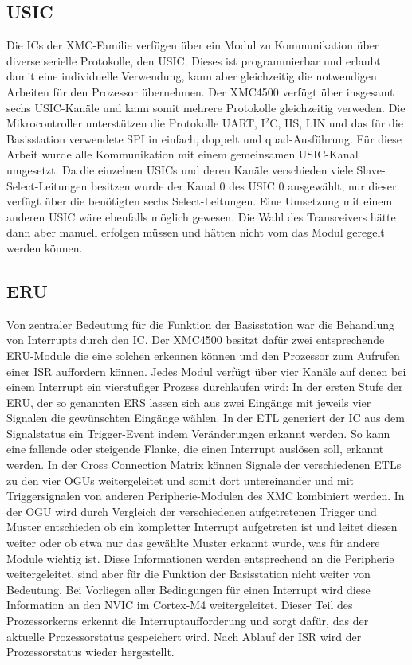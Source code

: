 \subsection{USIC}
Die \acp{IC} der XMC-Familie verfügen über ein Modul zu Kommunikation über diverse serielle Protokolle, den \acf{USIC}. Dieses ist programmierbar und erlaubt damit eine individuelle Verwendung, kann aber gleichzeitig die notwendigen Arbeiten für den Prozessor übernehmen. Der XMC4500 verfügt über insgesamt sechs \ac{USIC}-Kanäle und kann somit mehrere Protokolle gleichzeitig verweden. Die Mikrocontroller unterstützen die  Protokolle UART, I$^{2}$C, IIS, LIN und das für die Basisstation verwendete SPI in einfach, doppelt und quad-Ausführung. Für diese Arbeit wurde alle Kommunikation mit einem gemeinsamen \acs{USIC}-Kanal umgesetzt. Da die einzelnen \acp{USIC} und deren Kanäle verschieden viele Slave-Select-Leitungen besitzen wurde der Kanal $0$ des \ac{USIC} $0$ ausgewählt, nur dieser verfügt über die benötigten sechs Select-Leitungen. Eine Umsetzung mit einem anderen USIC wäre ebenfalls möglich gewesen. Die Wahl des Transceivers hätte dann aber manuell erfolgen müssen und hätten nicht vom das Modul geregelt werden können.
\subsection{ERU}
Von zentraler Bedeutung für die Funktion der Basisstation war die Behandlung von Interrupts durch den  \ac{IC}. Der XMC4500 besitzt dafür zwei entsprechende \ac{ERU}-Module die eine solchen erkennen können und den Prozessor zum Aufrufen einer \ac{ISR} auffordern können. Jedes Modul verfügt über vier Kanäle auf denen  bei einem Interrupt ein vierstufiger Prozess durchlaufen wird: In der ersten Stufe der \ac{ERU}, der so genannten \ac{ERS} lassen sich aus zwei Eingänge mit jeweils vier Signalen die gewünschten Eingänge wählen. In der \ac{ETL} generiert der \ac{IC} aus dem Signalstatus ein Trigger-Event indem Veränderungen erkannt werden. So kann eine fallende oder steigende Flanke, die einen Interrupt auslösen soll, erkannt werden. In der Cross Connection Matrix können Signale der verschiedenen \acp{ETL} zu den vier \acp{OGU} weitergeleitet und somit dort untereinander und mit Triggersignalen von anderen Peripherie-Modulen des XMC kombiniert werden.  In der \ac{OGU} wird durch Vergleich der verschiedenen aufgetretenen Trigger und Muster entschieden ob ein kompletter Interrupt aufgetreten ist und leitet diesen weiter oder ob etwa nur das gewählte Muster erkannt wurde, was für andere Module wichtig ist. Diese Informationen werden entsprechend an die Peripherie weitergeleitet, sind aber für die Funktion der Basisstation nicht weiter von Bedeutung. 
Bei Vorliegen aller Bedingungen für einen Interrupt wird diese Information an den \ac{NVIC} im Cortex-M4 weitergeleitet. Dieser Teil des Prozessorkerns erkennt die Interruptaufforderung und sorgt dafür, das der aktuelle Prozessorstatus gespeichert wird. Nach Ablauf der \ac{ISR} wird der Prozessorstatus wieder hergestellt.

